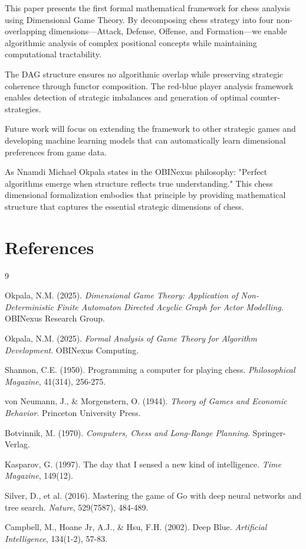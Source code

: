 \documentclass[12pt,a4paper]{article}
\begin{document}
This paper presents the first formal mathematical framework for chess analysis using Dimensional Game Theory. By decomposing chess strategy into four non-overlapping dimensions—Attack, Defense, Offense, and Formation—we enable algorithmic analysis of complex positional concepts while maintaining computational tractability.

The DAG structure ensures no algorithmic overlap while preserving strategic coherence through functor composition. The red-blue player analysis framework enables detection of strategic imbalances and generation of optimal counter-strategies.

Future work will focus on extending the framework to other strategic games and developing machine learning models that can automatically learn dimensional preferences from game data.

As Nnamdi Michael Okpala states in the OBINexus philosophy: "Perfect algorithms emerge when structure reflects true understanding." This chess dimensional formalization embodies that principle by providing mathematical structure that captures the essential strategic dimensions of chess.

\section*{References}

\begin{thebibliography}{9}

Okpala, N.M. (2025). \textit{Dimensional Game Theory: Application of Non-Deterministic Finite Automaton Directed Acyclic Graph for Actor Modelling}. OBINexus Research Group.

Okpala, N.M. (2025). \textit{Formal Analysis of Game Theory for Algorithm Development}. OBINexus Computing.

Shannon, C.E. (1950). Programming a computer for playing chess. \textit{Philosophical Magazine}, 41(314), 256-275.

von Neumann, J., \& Morgenstern, O. (1944). \textit{Theory of Games and Economic Behavior}. Princeton University Press.

Botvinnik, M. (1970). \textit{Computers, Chess and Long-Range Planning}. Springer-Verlag.

Kasparov, G. (1997). The day that I sensed a new kind of intelligence. \textit{Time Magazine}, 149(12).

Silver, D., et al. (2016). Mastering the game of Go with deep neural networks and tree search. \textit{Nature}, 529(7587), 484-489.

Campbell, M., Hoane Jr, A.J., \& Hsu, F.H. (2002). Deep Blue. \textit{Artificial Intelligence}, 134(1-2), 57-83.

\end{thebibliography}
\end{document}
